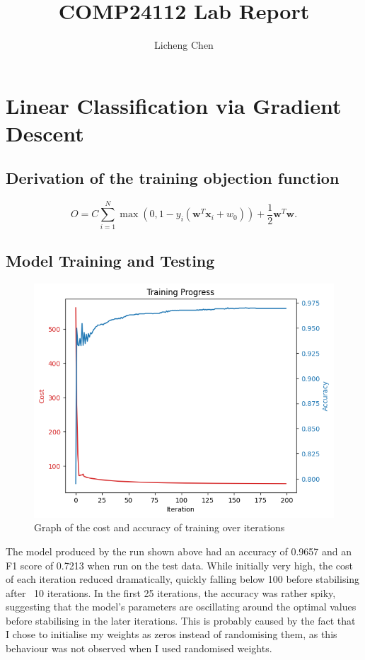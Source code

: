 \documentclass[a4paper]{article}
\title{COMP24112 Lab Report}
\author{Licheng Chen}
\begin{document}
\maketitle

\section{Linear Classification via Gradient Descent}

\subsection{Derivation of the training objection function}

$$O = C \sum^N_{i=1}\max\left(0, 1 - y_i \left(\mathbf{w}^T\mathbf{x}_i + w_0\right)\right) + \frac{1}{2}\mathbf{w}^T\mathbf{w}. $$


\newpage
\subsection{Model Training and Testing}
\begin{figure}[htbp]
    \centering
    \includegraphics[width=0.5\linewidth]{1.11.png}
    \caption{\centering Graph of the cost and accuracy of training over iterations}
\end{figure}

The model produced by the run shown above had an accuracy of 0.9657 and an F1 score of 0.7213 when run on the test data. While initially very high, the cost of each iteration reduced dramatically, quickly falling below 100 before stabilising after ~10 iterations. In the first 25 iterations, the accuracy was rather spiky, suggesting that the model's parameters are oscillating around the optimal values before stabilising in the later iterations. This is probably caused by the fact that I chose to initialise my weights as zeros instead of randomising them, as this behaviour was not observed when I used randomised weights.
\end{document}
